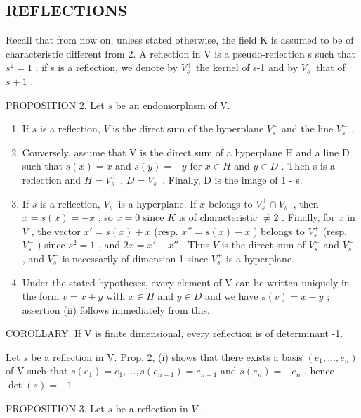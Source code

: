 \subsection{REFLECTIONS}

Recall that from now on, unless stated otherwise, the field K is assumed to be of characteristic different from 2. A reflection in V is a pseudo-reflection s such that \(s^{2}=1\) ; if s is a reflection, we denote by \(V_{s}^{+}\) the kernel of s-1 and by \(V_{s}^{-}\) that of \(s+1\) .

PROPOSITION 2. Let \(s\) be an endomorphism of V.

\begin{enumerate}
\def\labelenumi{(\roman{enumi})}
\item
  If \(s\) is a reflection, \(V\) is the direct sum of the hyperplane \(V_s^+\) and the line \(V_s^-\) .
\item
  Conversely, assume that V is the direct sum of a hyperplane H and a line D such that \(s(x) = x\) and \(s(y) = -y\) for \(x \in H\) and \(y \in D\) . Then s is a reflection and \(H = V_{s}^{+}\) , \(D = V_{s}^{-}\) . Finally, D is the image of 1 - s.
\item
  If \(s\) is a reflection, \(V_{s}^{+}\) is a hyperplane. If \(x\) belongs to \(V_{s}^{+} \cap V_{s}^{-}\) , then \(x = s(x) = -x\) , so \(x = 0\) since \(K\) is of characteristic \(\neq 2\) . Finally, for \(x\) in \(V\) , the vector \(x' = s(x) + x\) (resp. \(x'' = s(x) - x\) ) belongs to \(V_{s}^{+}\) (resp. \(V_{s}^{-}\) ) since \(s^2 = 1\) , and \(2x = x' - x''\) . Thus \(V\) is the direct sum of \(V_{s}^{+}\) and \(V_{s}^{-}\) , and \(V_{s}^{-}\) is necessarily of dimension 1 since \(V_{s}^{+}\) is a hyperplane.
\item
  Under the stated hypotheses, every element of V can be written uniquely in the form \(v = x + y\) with \(x \in H\) and \(y \in D\) and we have \(s(v) = x - y\) ; assertion (ii) follows immediately from this.
\end{enumerate}

COROLLARY. If V is finite dimensional, every reflection is of determinant -1.

Let \(s\) be a reflection in V. Prop. 2, (i) shows that there exists a basis \((e_1, \ldots, e_n)\) of V such that \(s(e_1) = e_1, \ldots, s(e_{n-1}) = e_{n-1}\) and \(s(e_n) = -e_n\) , hence \(\det(s) = -1\) .

PROPOSITION 3. Let \(s\) be a reflection in \(V\) .

